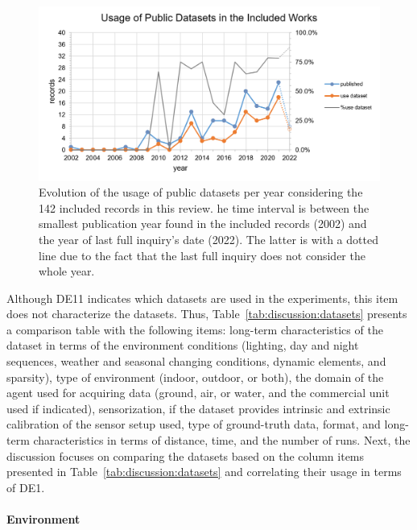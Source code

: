 \begin{figure}[!t]
  \centering
  \includegraphics[width=\columnwidth]{figures/datasets.png}
  \caption{Evolution of the usage of public datasets per year considering the 142 included records in this review. he time interval is between the smallest publication year found in the included records (2002) and the year of last full inquiry's date (2022). The latter is with a dotted line due to the fact that the last full inquiry does not consider the whole year.}
  \label{fig:discussion:datasets}
\end{figure}

Although DE11 indicates which datasets are used in the experiments, this item does not characterize the datasets. Thus, Table~\ref{tab:discussion:datasets} presents a comparison table with the following items: long-term characteristics of the dataset in terms of the environment conditions (lighting, day and night sequences, weather and seasonal changing conditions, dynamic elements, and sparsity), type of environment (indoor, outdoor, or both), the domain of the agent used for acquiring data (ground, air, or water, and the commercial unit used if indicated), sensorization, if the dataset provides intrinsic and extrinsic calibration of the sensor setup used, type of ground-truth data, format, and long-term characteristics in terms of distance, time, and the number of runs. Next, the discussion focuses on comparing the datasets based on the column items presented in Table~\ref{tab:discussion:datasets} and correlating their usage in terms of DE1.




\paragraph{Environment}

